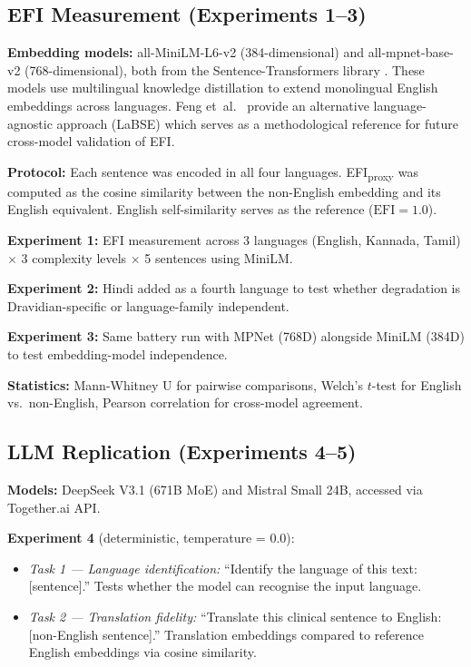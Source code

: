 \documentclass[11pt,a4paper]{article}
\begin{document}
\subsection{EFI Measurement (Experiments 1--3)}

\textbf{Embedding models:} all-MiniLM-L6-v2 (384-dimensional) and all-mpnet-base-v2 (768-dimensional), both from the Sentence-Transformers library \citep{reimers2020}. These models use multilingual knowledge distillation to extend monolingual English embeddings across languages. Feng et~al.\ \citep{feng2022} provide an alternative language-agnostic approach (LaBSE) which serves as a methodological reference for future cross-model validation of EFI.

\textbf{Protocol:} Each sentence was encoded in all four languages. EFI\textsubscript{proxy} was computed as the cosine similarity between the non-English embedding and its English equivalent. English self-similarity serves as the reference ($\text{EFI} = 1.0$).

\textbf{Experiment 1:} EFI measurement across 3 languages (English, Kannada, Tamil) $\times$ 3 complexity levels $\times$ 5 sentences using MiniLM.

\textbf{Experiment 2:} Hindi added as a fourth language to test whether degradation is Dravidian-specific or language-family independent.

\textbf{Experiment 3:} Same battery run with MPNet (768D) alongside MiniLM (384D) to test embedding-model independence.

\textbf{Statistics:} Mann-Whitney U for pairwise comparisons, Welch's $t$-test for English vs.\ non-English, Pearson correlation for cross-model agreement.

\subsection{LLM Replication (Experiments 4--5)}

\textbf{Models:} DeepSeek V3.1 (671B MoE) and Mistral Small 24B, accessed via Together.ai API.

\textbf{Experiment 4} (deterministic, temperature = 0.0):
\begin{itemize}
    \item \emph{Task 1 --- Language identification:} ``Identify the language of this text: [sentence].'' Tests whether the model can recognise the input language.
    \item \emph{Task 2 --- Translation fidelity:} ``Translate this clinical sentence to English: [non-English sentence].'' Translation embeddings compared to reference English embeddings via cosine similarity.
\end{itemize}
\end{document}
